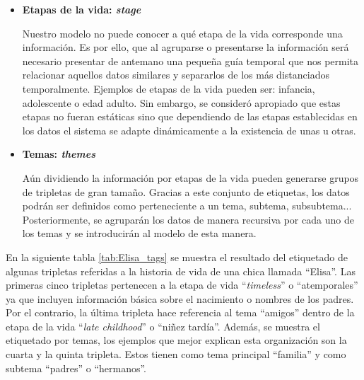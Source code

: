 \begin{itemize}
    \item\textbf{Etapas de la vida: \textit{stage}}\hfill
    
    Nuestro modelo no puede conocer a qué etapa de la vida corresponde una información. Es por ello, que al agruparse o presentarse la información será necesario presentar de antemano una pequeña guía temporal que nos permita relacionar aquellos datos similares y separarlos de los más distanciados temporalmente. Ejemplos de etapas de la vida pueden ser: infancia, adolescente o edad adulto. Sin embargo, se consideró apropiado que estas etapas no fueran estáticas sino que dependiendo de las etapas establecidas en los datos el sistema se adapte dinámicamente a la existencia de unas u otras.
    
    \item\textbf{Temas: \textit{themes}}\hfill
    
    Aún dividiendo la información por etapas de la vida pueden generarse grupos de tripletas de gran tamaño. Gracias a este conjunto de etiquetas, los datos podrán ser definidos como perteneciente a un tema, subtema, subsubtema... Posteriormente, se agruparán los datos de manera recursiva por cada uno de los temas y se introducirán al modelo de esta manera.
    
    
\end{itemize}

En la siguiente tabla \ref{tab:Elisa_tags} se muestra el resultado del etiquetado de algunas tripletas referidas a la historia de vida de una chica llamada ``Elisa''. Las primeras cinco tripletas pertenecen a la etapa de vida ``\textit{timeless}'' o ``atemporales'' ya que incluyen información básica sobre el nacimiento o nombres de los padres. Por el contrario, la última tripleta hace referencia al tema ``amigos'' dentro de la etapa de la vida ``\textit{late childhood}'' o ``niñez tardía''. Además, se muestra el etiquetado por temas, los ejemplos que mejor explican esta organización son la cuarta y la quinta tripleta. Estos tienen como tema principal ``familia'' y como subtema ``padres'' o ``hermanos''.

